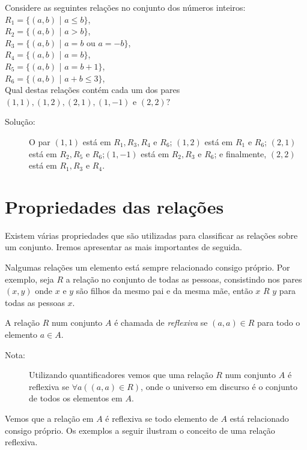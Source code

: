 \label{exem44}
\begin{exmp}
Considere as seguintes relações no conjunto dos números inteiros:\\
	$R_1 = \{(a,b)$ | $a \leq b\}$,\\
	$R_2 = \{(a,b)$ | $a > b\}$,\\
	$R_3 = \{(a,b)$ | $a = b $ ou $ a = -b\}$,\\
	$R_4 = \{(a,b)$ | $a = b\}$,\\
	$R_5 = \{(a,b)$ | $a = b + 1\}$,\\
	$R_6 = \{(a,b)$ | $a + b \leq 3\}$,\\
	Qual destas relações contém cada um dos pares $(1,1), (1,2), (2,1), (1,-1)$ e
$(2,2)?$

\begin{description}
\item[Solução:]O par $(1,1)$ está em $R_1, R_3, R_4$ e $R_6$; $(1,2)$ está em
$R_1$ e $R_6$; $(2,1)$ está em $R_2, R_5$ e $R_6$;$(1,-1)$ está em $R_2, R_3$ e
$R_6$; e finalmente, $(2,2)$ está em $R_1, R_3$ e $R_4$.
\end{description}
\end{exmp}


\section{Propriedades das relações}
Existem várias propriedades que são utilizadas para classificar as relações
sobre um conjunto. Iremos apresentar as mais importantes de seguida.

Nalgumas relações um elemento está sempre relacionado consigo próprio. Por
exemplo, seja $R$ a relação no conjunto de todas as pessoas, consistindo nos pares
$(x,y)$ onde $x$ e $y$ são filhos da mesmo pai e da mesma mãe, então $x$ $R$ $y$
para todas as pessoas $x$.

\label{def43}
\begin{defn}
A relação $R$ num conjunto $A$ é chamada de \emph{reflexiva} se $(a,a) \in R$
para todo o elemento $a \in A$.
	
\begin{description}
\item[Nota:]Utilizando quantificadores vemos que uma relação $R$ num conjunto
$A$ é reflexiva se $\forall a((a,a) \in R)$, onde o universo em discurso é o
conjunto de todos os elementos em $A$.
\end{description}
\end{defn}

Vemos que a relação em $A$ é reflexiva se todo elemento de $A$ está relacionado
consigo próprio. Os exemplos a seguir ilustram o conceito de uma relação
reflexiva.

